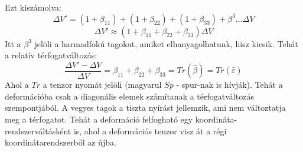 \documentclass[a4paper,12pt]{article}
\begin{document}
Ezt kiszámolva:
\begin{equation}
    \Delta V' = (1 + \beta_{11}) + (1 + \beta_{22}) + (1 + \beta_{33}) + \beta^3 \dots  \Delta V
\end{equation}
\begin{equation}
    \Delta V' \approx \left(1 + \beta_{11} + \beta_{22} + \beta_{33}\right) \Delta V
\end{equation}
Itt a $\beta^3$ jelöli a harmadfokú tagokat, amiket elhanyagolhatunk, hisz kicsik. Tehát a relatív térfogatváltozás:
\begin{equation}
    \frac{\Delta V' - \Delta V}{\Delta V} = \beta_{11} + \beta_{22} + \beta_{33} = Tr(\hat{\beta}) = Tr(\hat{\varepsilon})
\end{equation}
Ahol a $Tr$ a tenzor nyomát jelöli (magyarul $Sp$ - spur-nak is hívják). Tehát a deformációba csak a diagonális elemek számítanak a térfogatváltozás szempontjából.
A vegyes tagok a tiszta nyírást jellemzik, ami nem változtatja meg a térfogatot. Tehát a deformáció felfogható egy koordináta-rendszerváltásként is, ahol a deformációs tenzor visz át a régi koordinátarendszerből az újba.
\end{document}
